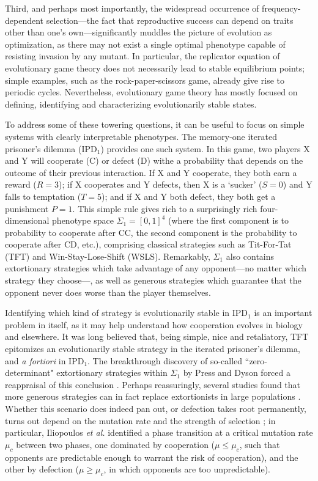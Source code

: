\documentclass[12pt]{article}
\def\IPD{\textrm{IPD}}
\def\IPD1{\textrm{IPD}_1}
\begin{document}
Third, and perhaps most importantly, the widespread occurrence of frequency-dependent selection---the fact that reproductive success can depend on traits other than one's own---significantly muddles the picture of evolution as optimization, as there may not exist a single optimal phenotype capable of resisting invasion by any mutant. In particular, the replicator equation of evolutionary game theory does not necessarily lead to stable equilibrium points; simple examples, such as the rock-paper-scissors game, already give rise to periodic cycles.  Nevertheless, evolutionary game theory has mostly focused on defining, identifying and characterizing evolutionarily stable states.  

To address some of these towering questions, it can be useful to focus on simple systems with clearly interpretable phenotypes. The memory-one iterated prisoner's dilemma ($\IPD1$) provides one such system. In this game, two players X and Y will cooperate (C) or defect (D) withe a probability that depends on the outcome of their previous interaction. If X and Y cooperate, they both earn a reward ($R = 3$); if X cooperates and Y defects, then X is a `sucker' ($S = 0$) and Y falls to temptation ($T = 5$); and if X and Y both defect, they both get a punishment $P=1$. This simple rule gives rich to a surprisingly rich four-dimensional phenotype space $\Sigma_1 = [0, 1]^4$ (where the first component is to probability to cooperate after CC, the second component is the probability to cooperate after CD, etc.), comprising classical strategies such as Tit-For-Tat (TFT) and Win-Stay-Lose-Shift (WSLS). Remarkably, $\Sigma_1$ also contains extortionary strategies which take advantage of any opponent---no matter which strategy they choose---, as well as generous strategies which guarantee that the opponent never does worse than the player themselves.

Identifying which kind of strategy is evolutionarily stable in $\IPD1$ is an important problem in itself, as it may help understand how cooperation evolves in biology and elsewhere. It was long believed that, being simple, nice and retaliatory, TFT epitomizes an evolutionarily stable strategy in the iterated prisoner's dilemma, and \emph{a fortiori} in $\IPD1$. The breakthrough discovery of so-called ``zero-determinant" extortionary strategies within $\Sigma_1$ by Press and Dyson \cite{press_iterated_2012} forced a reappraisal of this conclusion \cite{ball_physicists_2012}. Perhaps reassuringly, several studies found that more generous strategies can in fact replace extortionists in large populations \cite{adami_evolutionary_2013,stewart_extortion_2013}. Whether this scenario does indeed pan out, or defection takes root permanently, turns out depend on the mutation rate and the strength of selection \cite{stewart_extortion_2013, iliopoulos_critical_2010}; in particular, Iliopoulos \emph{et al.} identified a phase transition at a critical mutation rate $\mu_c$ between two phases, one dominated by cooperation ($\mu \leq \mu_c$, such that opponents are predictable enough to warrant the risk of cooperation), and the other by defection ($\mu \geq \mu_c$, in which opponents are too unpredictable).
\end{document}
